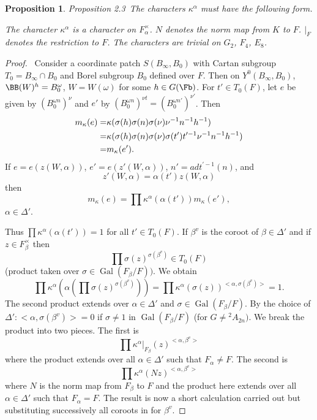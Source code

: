 \documentclass{memo-l}
\newtheorem{proposition}[theorem]{Proposition}
\theoremstyle{definition}
\theoremstyle{remark}
\numberwithin{section}{chapter}
\numberwithin{equation}{chapter}
\begin{document}
\begin{proposition}{Proposition 2.3}\ The characters ${\kappa}^{{\alpha}}$ must have the
following form.

\vfill\eject
\medskip
\eject\vfill
\vfill\eject

\noindent
The character ${\kappa}^{{\alpha}}$ is a character on $F_{{\alpha}}^{\times}$.
$N$ denotes the norm map from $K$ to $F$.  $\vert _{F}$ denotes the
restriction to $F$. The characters are trivial on $G_2$, $F_4$, $E_8$.
\end{proposition}


\begin{proof} \ Consider
a coordinate patch $S(B_{ \infty },B_{0})$ with Cartan subgroup
$T_{0} = B_{{\infty}} \cap B_{0}$ and Borel subgroup $B_{0}$ defined over
$F$.  Then on $Y^{0}(B_{{\infty}},B_{0})$, ${\BB}(W)^{h}  =
B_{0}^{{\omega}}$, $W = W({\omega})$ for some $h  \in  G(\Fb)$.  For $t'
 \in  T_{0}(F)$, let $e$ be given by $(B_{0}^{{\omega}n})^{{\nu}}$ and $e'$
by $(B_{0}^{{\omega}n})^{{\nu}t}  =  (B_{0}^{{\omega}n'})^{{\nu}'}$.  Then
$$\aligned m_{{\kappa}}(e)  =&
{\kappa}({\sigma}(h){\sigma}(n){\sigma}({\nu}){\nu}^{-1}n^{-1}h^{-1})
\\ =&
{\kappa}({\sigma}(h){\sigma}(n){\sigma}({\nu}){\sigma}(t')t^{\prime-1}{\nu}^{-1}n^{-1}h^{-1})
 \\=&  m_{{\kappa}}(e').\endaligned
$$
If $e = e(z(W,{\alpha}))$, $e' = e(z'(W,{\alpha}))$, $n' =  adt^{\prime-1}(n)$, and
$$z'(W,{\alpha}) = {\alpha}(t')z(W,{\alpha})$$ then $$m_{{\kappa}}(e) =
\prod{\kappa}^{{\alpha}}({\alpha}(t'))m_{{\kappa}}(e'),$$ ${\alpha}  \in
{\Delta}'$.

   Thus $\prod{\kappa}^{{\alpha}}({\alpha}(t')) = 1$ for all $t'  \in
T_{0}(F)$.  If ${\beta}^{v}$ is the coroot of ${\beta}  \in  {\Delta}'$ and
if $z  \in  F_{{\beta}}^{\times}$ then $$\prod{\sigma}(z)^{{\sigma}({\beta}^{v})}
 \in  T_{0}(F)$$ (product taken over ${\sigma}
 \in  \operatorname{Gal}(F_{{\beta}}/F))$.  We obtain
$$
\prod{\kappa}^{{\alpha}}({\alpha}(\prod{\sigma}(z)^{{\sigma}({\beta}^{v})}))
= \prod{\kappa}^{{\alpha}}({\sigma}(z))^{<{\alpha},{\sigma}({\beta}^{v})>} = 1.
$$
The second product extends over ${\alpha}  \in  {\Delta}'$ and ${\sigma}
 \in  \operatorname{Gal}(F_{{\beta}}/F)$.  By the choice of ${\Delta}' :
<{\alpha},{\sigma}({\beta}^{v})> = 0$ if ${\sigma} \ne 1$ in
$\operatorname{Gal}(F_{{\beta}}/F)$ (for $G \ne {{}^{2}A_{2n}})$.  We break the product into
two pieces.  The first is
$$
\prod{\kappa}^{{\alpha}}\vert _{F_{{\beta}}}
(z)^{<{\alpha},{\beta^v}>}
$$
where the product extends over all ${\alpha}  \in  {\Delta}'$ such that
$F_{{\alpha}} \ne F$.  The second is
$$
\prod{\kappa}^{{\alpha}}(Nz)^{<{\alpha},{\beta^v}>}
$$
where $N$ is the norm map from $F_{{\beta}}$ to $F$ and the product here
extends over all ${\alpha}  \in  {\Delta}'$ such that $F_{{\alpha}}  =  F$.
The result is now a short calculation carried out but substituting
successively all coroots in for ${\beta}^{v}$.
\end{proof}
\end{document}
